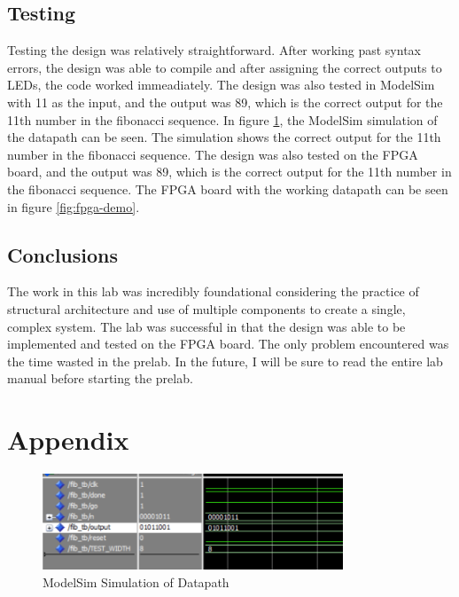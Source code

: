 \documentclass{article}
\begin{document}
\subsection*{Testing}
Testing the design was relatively straightforward. After working past syntax errors, the design was able to compile and after assigning the correct outputs to LEDs, the code worked immeadiately. The design was also tested in ModelSim with 11 as the input, and the output was 89, which is the correct output for the 11th number in the fibonacci sequence. In figure \ref{fig:model-sim}, the ModelSim simulation of the datapath can be seen. The simulation shows the correct output for the 11th number in the fibonacci sequence. The design was also tested on the FPGA board, and the output was 89, which is the correct output for the 11th number in the fibonacci sequence. The FPGA board with the working datapath can be seen in figure \ref{fig:fpga-demo}.
\subsection*{Conclusions}
The work in this lab was incredibly foundational considering the practice of structural architecture and use of multiple components to create a single, complex system. The lab was successful in that the design was able to be implemented and tested on the FPGA board. The only problem encountered was the time wasted in the prelab. In the future, I will be sure to read the entire lab manual before starting the prelab.

\section*{Appendix}

\begin{figure}[H]
  \centering
  \includegraphics[width=0.8\textwidth]{P1_sim/fib_tb_sim.png}
  \caption{ModelSim Simulation of Datapath}
  \label{fig:model-sim}
\end{figure}
\end{document}
